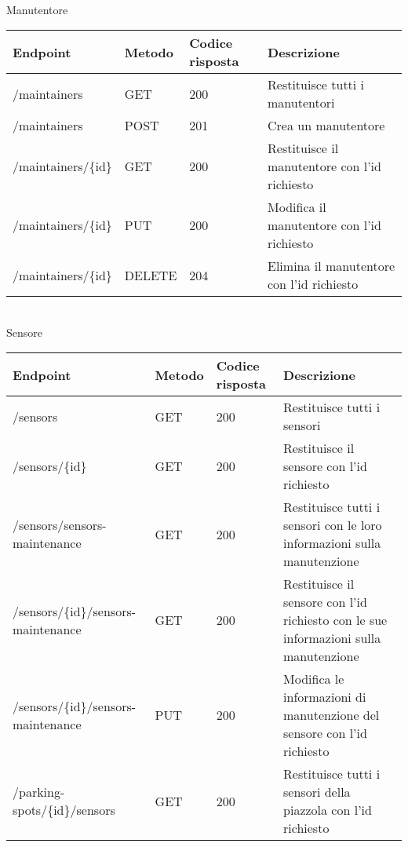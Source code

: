 \leavevmode\newline
\\
Manutentore
\\
\begin{table}
    \begin{tabular}{|p{3.2cm}|p{1.4cm}|p{1.3cm}|p{5.8cm}|} 
    \hline
    Endpoint & Metodo & Codice risposta & Descrizione \\ 
    \hline
    /maintainers & GET & 200 & Restituisce tutti i manutentori \\ 
    \hline
    /maintainers & POST & 201 & Crea un manutentore \\ 
    \hline
    /maintainers/\{id\} & GET & 200 & Restituisce il manutentore con l'id richiesto \\ 
    \hline
    /maintainers/\{id\} & PUT & 200 & Modifica il manutentore con l'id richiesto \\ 
    \hline
    /maintainers/\{id\} & DELETE & 204 & Elimina il manutentore con l'id richiesto \\ 
    \hline
    \end{tabular}
\end{table}
\leavevmode\newline
\\
Sensore
\\
\begin{table}
    \begin{tabular}{|p{3.2cm}|p{1.4cm}|p{1.3cm}|p{5.8cm}|} 
    \hline
    Endpoint & Metodo & Codice risposta & Descrizione \\ 
    \hline
    /sensors & GET & 200 & Restituisce tutti i sensori \\ 
    \hline
    /sensors/\{id\} & GET & 200 & Restituisce il sensore con l'id richiesto \\ 
    \hline
    /sensors/sensors-maintenance & GET & 200 & Restituisce tutti i sensori con le loro informazioni sulla 
        manutenzione \\ 
    \hline
    /sensors/\{id\}/sensors-maintenance & GET & 200 & Restituisce il sensore con l'id richiesto con le sue 
        informazioni sulla manutenzione \\ 
    \hline
    /sensors/\{id\}/sensors-maintenance & PUT & 200 & Modifica le informazioni di manutenzione del sensore con
        l'id richiesto \\ 
    \hline
    /parking-spots/\{id\}/sensors & GET & 200 & Restituisce tutti i sensori della piazzola con l'id richiesto \\ 
    \hline
    \end{tabular}
\end{table}
